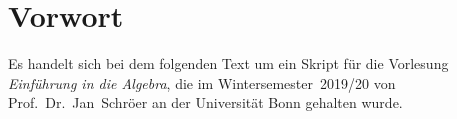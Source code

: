\chapter*{Vorwort}

Es handelt sich bei dem folgenden Text um ein Skript für die Vorlesung \emph{Einführung in die Algebra}, die im Wintersemester~2019/20 von Prof.~Dr.~Jan~Schröer an der Universität Bonn gehalten wurde.

